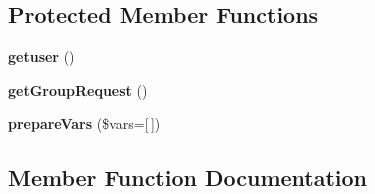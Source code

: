 \subsection*{Protected Member Functions}
\begin{DoxyCompactItemize}
\item 
\hypertarget{classDMA_1_1Friends_1_1Components_1_1GroupRequest_abf24425ad2bc88375097dd15bb35fd01}{}{\bfseries getuser} ()\label{classDMA_1_1Friends_1_1Components_1_1GroupRequest_abf24425ad2bc88375097dd15bb35fd01}

\item 
\hypertarget{classDMA_1_1Friends_1_1Components_1_1GroupRequest_a45abdc367821a9a6d105917f125057e9}{}{\bfseries get\+Group\+Request} ()\label{classDMA_1_1Friends_1_1Components_1_1GroupRequest_a45abdc367821a9a6d105917f125057e9}

\item 
\hypertarget{classDMA_1_1Friends_1_1Components_1_1GroupRequest_a8c20a7584f43b3e79ea92e77f8ba4b45}{}{\bfseries prepare\+Vars} (\$vars=\mbox{[}$\,$\mbox{]})\label{classDMA_1_1Friends_1_1Components_1_1GroupRequest_a8c20a7584f43b3e79ea92e77f8ba4b45}

\end{DoxyCompactItemize}


\subsection{Member Function Documentation}
\hypertarget{classDMA_1_1Friends_1_1Components_1_1GroupRequest_a809f2ed08437eb0458240725f07d098c}{}
